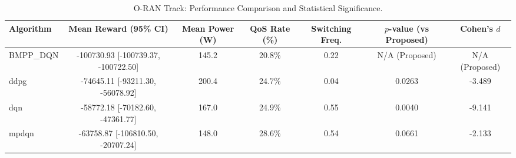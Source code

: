 \begin{table}[h]
\centering
\caption{O-RAN Track: Performance Comparison and Statistical Significance.}
\begin{tabular}{lcccccc}
\hline
Algorithm & Mean Reward (95\% CI) & Mean Power (W) & QoS Rate (\%) & Switching Freq. & $p$-value (vs Proposed) & Cohen's $d$ \\
\hline
BMPP_DQN & -100730.93 [-100739.37, -100722.50] & 145.2 & 20.8\% & 0.22 & N/A (Proposed) & N/A (Proposed) \\
ddpg & -74645.11 [-93211.30, -56078.92] & 200.4 & 24.7\% & 0.04 & 0.0263 & -3.489 \\
dqn & -58772.18 [-70182.60, -47361.77] & 167.0 & 24.9\% & 0.55 & 0.0040 & -9.141 \\
mpdqn & -63758.87 [-106810.50, -20707.24] & 148.0 & 28.6\% & 0.54 & 0.0661 & -2.133 \\
\hline
\end{tabular}
\end{table}
